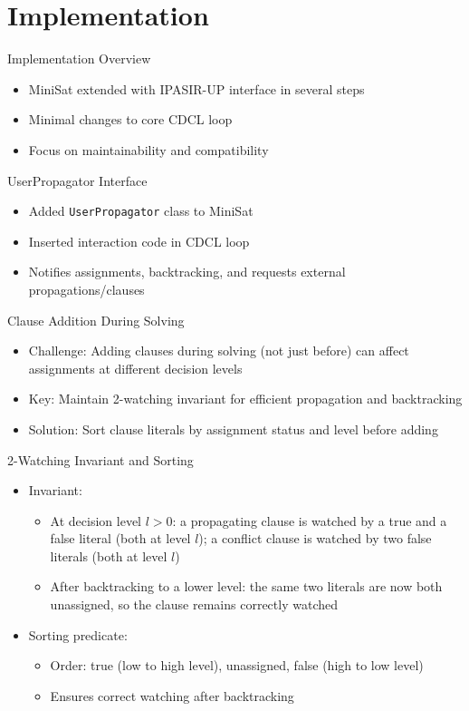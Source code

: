 \documentclass{beamer}
\newcommand*{\code}[1]{\lstinline[basicstyle=\ttfamily, breaklines]|#1|}
\begin{document}
\section{Implementation}

\begin{frame}{Implementation Overview}
  \begin{itemize}
    \item MiniSat extended with IPASIR-UP interface in several steps
    \item Minimal changes to core CDCL loop
    \item Focus on maintainability and compatibility
  \end{itemize}
\end{frame}

\begin{frame}{UserPropagator Interface}
  \begin{itemize}
    \item Added \code{UserPropagator} class to MiniSat
    \item Inserted interaction code in CDCL loop
    \item Notifies assignments, backtracking, and requests external propagations/clauses
  \end{itemize}
\end{frame}

\begin{frame}{Clause Addition During Solving}
  \begin{itemize}
    \item Challenge: Adding clauses during solving (not just before) can affect assignments at different decision levels
    \item Key: Maintain 2-watching invariant for efficient propagation and backtracking
    \item Solution: Sort clause literals by assignment status and level before adding
  \end{itemize}
\end{frame}

\begin{frame}{2-Watching Invariant and Sorting}
  \begin{itemize}
    \item Invariant:
    \begin{itemize}
      \item At decision level $l > 0$: a propagating clause is watched by a true and a false literal (both at level $l$); a conflict clause is watched by two false literals (both at level $l$)
      \item After backtracking to a lower level: the same two literals are now both unassigned, so the clause remains correctly watched
    \end{itemize}
    \item Sorting predicate:
    \begin{itemize}
      \item Order: true (low to high level), unassigned, false (high to low level)
      \item Ensures correct watching after backtracking
    \end{itemize}
  \end{itemize}
\end{frame}
\end{document}
